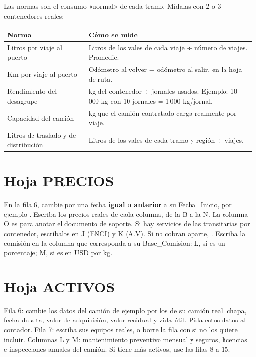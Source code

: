 Las normas son el consumo «normal» de cada tramo. Mídalas con 2 o 3 contenedores reales:

\begin{center}
\begin{tabularx}{\linewidth}{@{}l>{\raggedright\arraybackslash}X@{}}
\toprule
\textbf{Norma} & \textbf{Cómo se mide} \\ \midrule
Litros por viaje al puerto & Litros de los vales de cada viaje ÷ número de viajes. Promedie. \\
Km por viaje al puerto & Odómetro al volver $-$ odómetro al salir, en la hoja de ruta. \\
Rendimiento del desagrupe & kg del contenedor ÷ jornales usados. Ejemplo: 10\,000 kg con 10 jornales = 1\,000 kg/jornal. \\
Capacidad del camión & kg que el camión contratado carga realmente por viaje. \\
Litros de traslado y de distribución & Litros de los vales de cada tramo y región ÷ viajes. \\
\bottomrule
\end{tabularx}
\end{center}

\section{Hoja PRECIOS}

\begin{pasos}
\paso En la fila 6, cambie  por una fecha \textbf{igual o anterior} a su Fecha\_Inicio, por ejemplo .
\paso Escriba los precios reales de cada columna, de la B a la N. La columna O es para anotar el documento de soporte.
\paso Si hay servicios de las transitarias por contenedor, escríbalos en J (ENCI) y K (A.V). Si no cobran aparte, .
\paso Escriba la comisión en la columna que corresponda a su Base\_Comision: L, si es un porcentaje; M, si es en USD por kg.
\end{pasos}

\section{Hoja ACTIVOS}

\begin{pasos}
\paso Fila 6: cambie los datos del camión de ejemplo por los de su camión real: chapa, fecha de alta, valor de adquisición, valor residual y
      vida útil. Pida estos datos al contador.
\paso Fila 7: escriba sus equipos reales, o borre la fila con  si no los quiere incluir.
\paso Columnas L y M: mantenimiento preventivo mensual y seguros, licencias e inspecciones anuales del camión.
\paso Si tiene más activos, use las filas 8 a 15.
\end{pasos}

